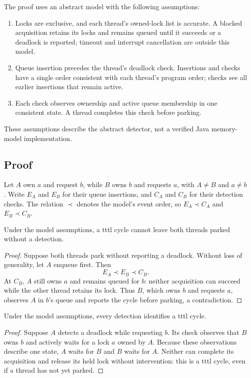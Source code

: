 The proof uses an abstract model with the following assumptions:
\begin{enumerate}
\item Locks are exclusive, and each thread's owned-lock list is accurate. A blocked acquisition retains its locks and remains queued until it succeeds or a deadlock is reported; timeout and interrupt cancellation are outside this model.
\item Queue insertion precedes the thread's deadlock check. Insertions and checks have a single order consistent with each thread's program order; checks see all earlier insertions that remain active.
\item Each check observes ownership and active queue membership in one consistent state. A thread completes this check before parking.
\end{enumerate}
These assumptions describe the abstract detector, not a verified Java memory-model implementation.

\subsection{Proof}

Let $A$ own $a$ and request $b$, while $B$ owns $b$ and requests $a$, with $A \ne B$ and $a \ne b$.
Write $E_A$ and $E_B$ for their queue insertions, and $C_A$ and $C_B$ for their detection checks.
The relation $\prec$ denotes the model's event order, so $E_A \prec C_A$ and $E_B \prec C_B$.

\begin{Lem}
Under the model assumptions, a \ac{tttl} cycle cannot leave both threads parked without a detection.
\end{Lem}
\begin{proof}
Suppose both threads park without reporting a deadlock.
Without loss of generality, let $A$ enqueue first. Then
\begin{equation}
E_A \prec E_B \prec C_B.
\end{equation}
At $C_B$, $A$ still owns $a$ and remains queued for $b$: neither acquisition can succeed while the other thread retains its lock.
Thus $B$, which owns $b$ and requests $a$, observes $A$ in $b$'s queue and reports the cycle before parking, a contradiction.
\end{proof}

\begin{Lem}
Under the model assumptions, every detection identifies a \ac{tttl} cycle.
\end{Lem}
\begin{proof}
Suppose $A$ detects a deadlock while requesting $b$.
Its check observes that $B$ owns $b$ and actively waits for a lock $a$ owned by $A$.
Because these observations describe one state, $A$ waits for $B$ and $B$ waits for $A$.
Neither can complete its acquisition and release its held lock without intervention: this is a \ac{tttl} cycle, even if a thread has not yet parked.
\end{proof}

